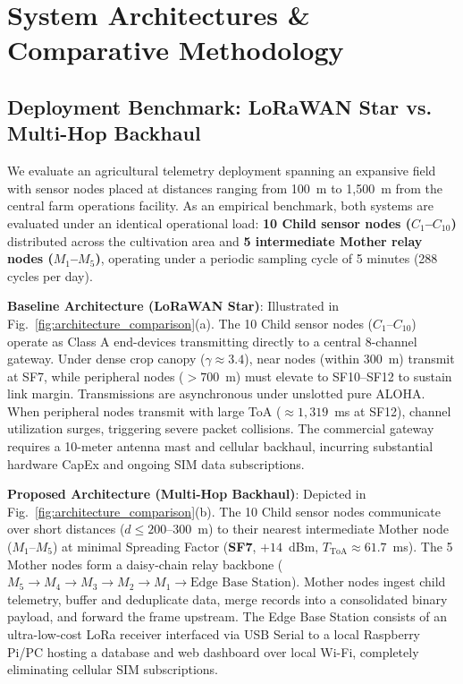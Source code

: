 \documentclass[conference]{IEEEtran}
\begin{document}
\section{System Architectures \& Comparative Methodology}
\label{sec:system_architecture}

\subsection{Deployment Benchmark: LoRaWAN Star vs. Multi-Hop Backhaul}
We evaluate an agricultural telemetry deployment spanning an expansive field with sensor nodes placed at distances ranging from 100~m to 1,500~m from the central farm operations facility. As an empirical benchmark, both systems are evaluated under an identical operational load: \textbf{10 Child sensor nodes ($C_1$--$C_{10}$)} distributed across the cultivation area and \textbf{5 intermediate Mother relay nodes ($M_1$--$M_5$)}, operating under a periodic sampling cycle of 5 minutes (288 cycles per day).

\textbf{Baseline Architecture (LoRaWAN Star)}: Illustrated in Fig.~\ref{fig:architecture_comparison}(a). The 10 Child sensor nodes ($C_1$--$C_{10}$) operate as Class A end-devices transmitting directly to a central 8-channel gateway. Under dense crop canopy ($\gamma \approx 3.4$), near nodes (within 300~m) transmit at SF7, while peripheral nodes ($>700$~m) must elevate to SF10--SF12 to sustain link margin. Transmissions are asynchronous under unslotted pure ALOHA. When peripheral nodes transmit with large ToA ($\approx 1,319$~ms at SF12), channel utilization surges, triggering severe packet collisions. The commercial gateway requires a 10-meter antenna mast and cellular backhaul, incurring substantial hardware CapEx and ongoing SIM data subscriptions.

\textbf{Proposed Architecture (Multi-Hop Backhaul)}: Depicted in Fig.~\ref{fig:architecture_comparison}(b). The 10 Child sensor nodes communicate over short distances ($d \le 200$--$300$~m) to their nearest intermediate Mother node ($M_1$--$M_5$) at minimal Spreading Factor (\textbf{SF7}, $+14$~dBm, $T_{\text{ToA}} \approx 61.7$~ms). The 5 Mother nodes form a daisy-chain relay backbone ($M_5 \rightarrow M_4 \rightarrow M_3 \rightarrow M_2 \rightarrow M_1 \rightarrow \text{Edge Base Station}$). Mother nodes ingest child telemetry, buffer and deduplicate data, merge records into a consolidated binary payload, and forward the frame upstream. The Edge Base Station consists of an ultra-low-cost LoRa receiver interfaced via USB Serial to a local Raspberry Pi/PC hosting a database and web dashboard over local Wi-Fi, completely eliminating cellular SIM subscriptions.
\end{document}
